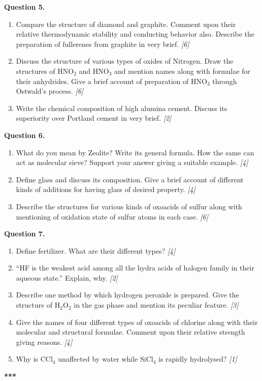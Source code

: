 \documentclass[11pt,a4paper]{article}
\newcommand{\pts}[1]{\hfill \textit{[#1]}}
\begin{document}
\bigskip

\noindent \textbf{Question 5.}
\begin{enumerate}[label=(\alph*)]
  \item Compare the structure of diamond and graphite. Comment upon their relative thermodynamic stability and conducting behavior also. Describe the preparation of fullerenes from graphite in very brief. \pts{6}
  \item Discuss the structure of various types of oxides of Nitrogen. Draw the structures of $\text{HNO}_2$ and $\text{HNO}_3$ and mention names along with formulae for their anhydrides. Give a brief account of preparation of $\text{HNO}_3$ through Ostwald's process. \pts{6}
  \item Write the chemical composition of high alumina cement. Discuss its superiority over Portland cement in very brief. \pts{2}
\end{enumerate}

\bigskip

\noindent \textbf{Question 6.}
\begin{enumerate}[label=(\alph*)]
  \item What do you mean by Zeolite? Write its general formula. How the same can act as molecular sieve? Support your answer giving a suitable example. \pts{4}
  \item Define glass and discuss its composition. Give a brief account of different kinds of additions for having glass of desired property. \pts{4}
  \item Describe the structures for various kinds of oxoacids of sulfur along with mentioning of oxidation state of sulfur atoms in each case. \pts{6}
\end{enumerate}

\bigskip

\noindent \textbf{Question 7.}
\begin{enumerate}[label=(\alph*)]
  \item Define fertilizer. What are their different types? \pts{4}
  \item ``HF is the weakest acid among all the hydra acids of halogen family in their aqueous state.'' Explain, why. \pts{2}
  \item Describe one method by which hydrogen peroxide is prepared. Give the structure of $\text{H}_2\text{O}_2$ in the gas phase and mention its peculiar feature. \pts{3}
  \item Give the names of four different types of oxoacids of chlorine along with their molecular and structural formulae. Comment upon their relative strength giving reasons. \pts{4}
  \item Why is $\text{CCl}_4$ unaffected by water while $\text{SiCl}_4$ is rapidly hydrolysed? \pts{1}
\end{enumerate}

\bigskip
\begin{center}
  \textbf{***}
\end{center}
\end{document}
